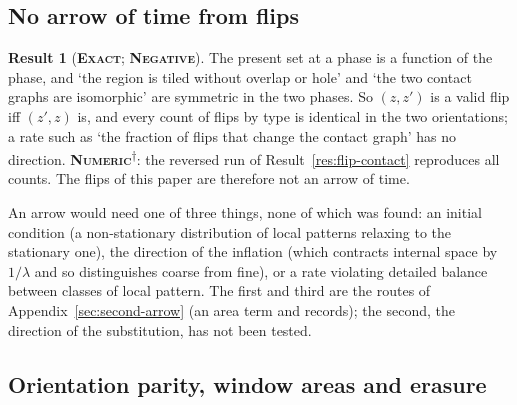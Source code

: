 \documentclass[11pt]{article}
\newcommand{\exact}{\textbf{\textsc{Exact}}}
\newcommand{\numeric}{\textbf{\textsc{Numeric}}}
\newcommand{\negres}{\textbf{\textsc{Negative}}}
\newcommand{\snap}{\textsuperscript{$\dagger$}}      %
\theoremstyle{definition}
\newtheorem{result}{Result}
\begin{document}
\subsection{No arrow of time from flips}\label{sec:flips-arrow}
\begin{result}[\exact; \negres]\label{res:flip-symmetry}
The present set at a phase is a function of the phase, and `the region is tiled without overlap or hole' and `the two contact graphs are isomorphic' are symmetric in the two phases. So $(z,z')$ is a valid flip iff $(z',z)$ is, and every count of flips by type is identical in the two orientations; a rate such as `the fraction of flips that change the contact graph' has no direction. \numeric\snap: the reversed run of Result~\ref{res:flip-contact} reproduces all counts. The flips of this paper are therefore not an arrow of time.
\end{result}
An arrow would need one of three things, none of which was found: an initial condition (a non-stationary distribution of local patterns relaxing to the stationary one), the direction of the inflation (which contracts internal space by $1/\lambda$ and so distinguishes coarse from fine), or a rate violating detailed balance between classes of local pattern. The first and third are the routes of Appendix~\ref{sec:second-arrow} (an area term and records); the second, the direction of the substitution, has not been tested.

\subsection{Orientation parity, window areas and erasure}
\label{sec:flips-parity}
\end{document}
